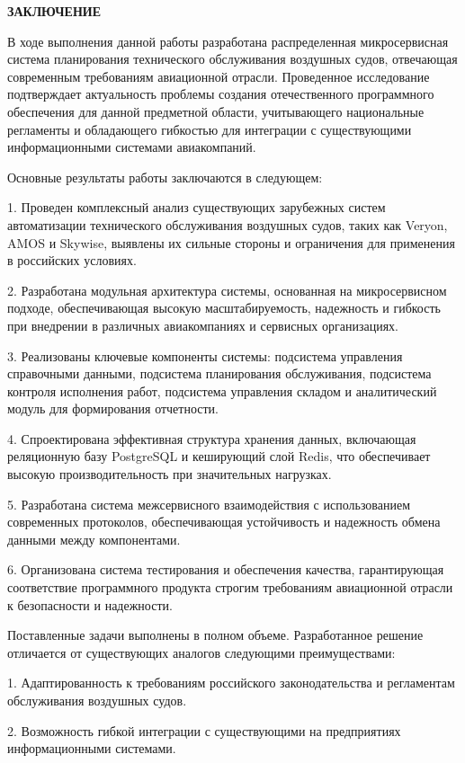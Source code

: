 \documentclass[14pt,a4paper]{extarticle}
\newcommand{\headersection}[1]{
  \begin{center}
    \textbf{\MakeUppercase{#1}}
  \end{center}
  \addcontentsline{toc}{section}{#1}
}
\begin{document}
\newpage

\headersection{ЗАКЛЮЧЕНИЕ}

В ходе выполнения данной работы разработана распределенная микросервисная система планирования технического обслуживания воздушных судов, отвечающая современным требованиям авиационной отрасли. Проведенное исследование подтверждает актуальность проблемы создания отечественного программного обеспечения для данной предметной области, учитывающего национальные регламенты и обладающего гибкостью для интеграции с существующими информационными системами авиакомпаний.

Основные результаты работы заключаются в следующем:

1. Проведен комплексный анализ существующих зарубежных систем автоматизации технического обслуживания воздушных судов, таких как Veryon, AMOS и Skywise, выявлены их сильные стороны и ограничения для применения в российских условиях.

2. Разработана модульная архитектура системы, основанная на микросервисном подходе, обеспечивающая высокую масштабируемость, надежность и гибкость при внедрении в различных авиакомпаниях и сервисных организациях.

3. Реализованы ключевые компоненты системы: подсистема управления справочными данными, подсистема планирования обслуживания, подсистема контроля исполнения работ, подсистема управления складом и аналитический модуль для формирования отчетности.

4. Спроектирована эффективная структура хранения данных, включающая реляционную базу PostgreSQL и кеширующий слой Redis, что обеспечивает высокую производительность при значительных нагрузках.

5. Разработана система межсервисного взаимодействия с использованием современных протоколов, обеспечивающая устойчивость и надежность обмена данными между компонентами.

6. Организована система тестирования и обеспечения качества, гарантирующая соответствие программного продукта строгим требованиям авиационной отрасли к безопасности и надежности.

Поставленные задачи выполнены в полном объеме. Разработанное решение отличается от существующих аналогов следующими преимуществами:

1. Адаптированность к требованиям российского законодательства и регламентам обслуживания воздушных судов.

2. Возможность гибкой интеграции с существующими на предприятиях информационными системами.
\end{document}
